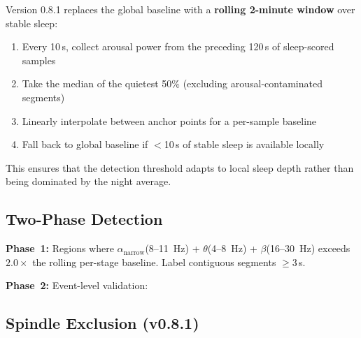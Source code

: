 \documentclass[11pt,a4paper,twocolumn]{article}
\begin{document}
Version 0.8.1 replaces the global baseline with a \textbf{rolling 2-minute window} over stable sleep:

\begin{enumerate}[nosep,leftmargin=1.5em]
  \item Every 10\,s, collect arousal power from the preceding 120\,s of sleep-scored samples
  \item Take the median of the quietest 50\% (excluding arousal-contaminated segments)
  \item Linearly interpolate between anchor points for a per-sample baseline
  \item Fall back to global baseline if $<$10\,s of stable sleep is available locally
\end{enumerate}

This ensures that the detection threshold adapts to local sleep depth rather than being dominated by the night average.

\subsection{Two-Phase Detection}

\textbf{Phase~1:} Regions where $\alpha_{\mathrm{narrow}}$(8--11~Hz) + $\theta$(4--8~Hz) + $\beta$(16--30~Hz) exceeds $2.0\times$ the rolling per-stage baseline. Label contiguous segments $\geq$3\,s.

\textbf{Phase~2:} Event-level validation:

\begin{table}[H]
\centering\small
\caption{Event-level arousal validation}
\end{table}

\subsection{Spindle Exclusion (v0.8.1)}
\end{document}
